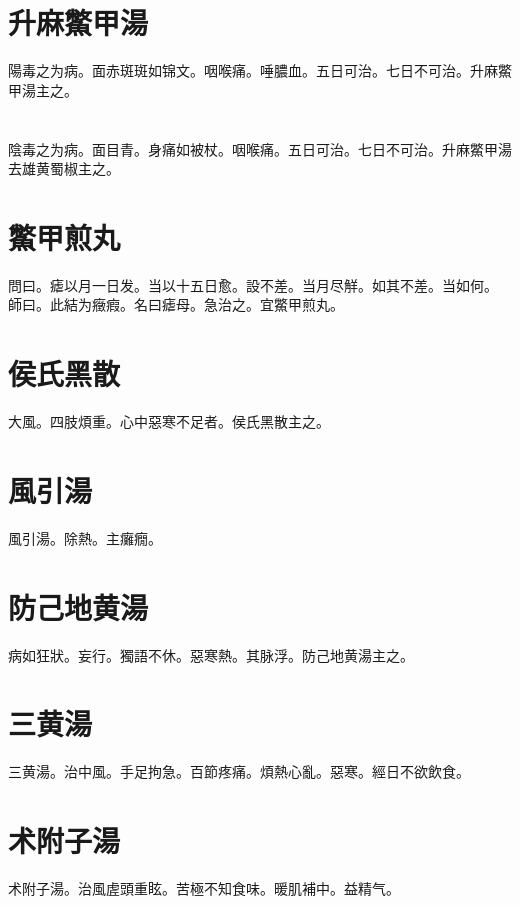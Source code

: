 \documentclass[12pt,twoside,UTF8,b5paper]{ctexbook}
\begin{document}
\section{升麻鱉甲湯}

陽毒之为病。面赤斑斑如锦文。咽喉痛。唾膿血。五日可治。七日不可治。升麻鱉甲湯主之。

\section{}

陰毒之为病。面目青。身痛如被杖。咽喉痛。五日可治。七日不可治。升麻鱉甲湯去雄黄蜀椒主之。

\section{鱉甲煎丸}

問曰。瘧以月一日发。当以十五日愈。設不差。当月尽觧。如其不差。当如何。\\
師曰。此結为癥瘕。名曰瘧母。急治之。宜鱉甲煎丸。

\section{侯氏黑散}

大風。四肢煩重。心中惡寒不足者。侯氏黑散主之。

\section{風引湯}

風引湯。除熱。主癱癇。

\section{防己地黄湯}

病如狂狀。妄行。獨語不休。惡寒熱。其脉浮。防己地黄湯主之。

\section{三黄湯}

三黄湯。治中風。手足拘急。百節疼痛。煩熱心亂。惡寒。經日不欲飲食。

\section{术附子湯}

术附子湯。治風虗頭重眩。苦極不知食味。暖肌補中。益精气。
\end{document}
